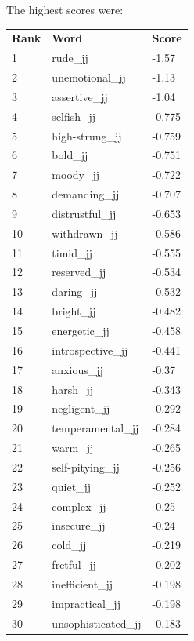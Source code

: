 \documentclass[10pt,letterpaper]{book}
\begin{document}
The highest scores were:
\begin{tabular}{ l l l }
        \textbf{Rank} & \textbf{Word} & \textbf{Score} \\
        1 & rude\_jj & -1.57 \\
        2 & unemotional\_jj & -1.13 \\
        3 & assertive\_jj & -1.04 \\
        4 & selfish\_jj & -0.775 \\
        5 & high-strung\_jj & -0.759 \\
        6 & bold\_jj & -0.751 \\
        7 & moody\_jj & -0.722 \\
        8 & demanding\_jj & -0.707 \\
        9 & distrustful\_jj & -0.653 \\
        10 & withdrawn\_jj & -0.586 \\
        11 & timid\_jj & -0.555 \\
        12 & reserved\_jj & -0.534 \\
        13 & daring\_jj & -0.532 \\
        14 & bright\_jj & -0.482 \\
        15 & energetic\_jj & -0.458 \\
        16 & introspective\_jj & -0.441 \\
        17 & anxious\_jj & -0.37 \\
        18 & harsh\_jj & -0.343 \\
        19 & negligent\_jj & -0.292 \\
        20 & temperamental\_jj & -0.284 \\
        21 & warm\_jj & -0.265 \\
        22 & self-pitying\_jj & -0.256 \\
        23 & quiet\_jj & -0.252 \\
        24 & complex\_jj & -0.25 \\
        25 & insecure\_jj & -0.24 \\
        26 & cold\_jj & -0.219 \\
        27 & fretful\_jj & -0.202 \\
        28 & inefficient\_jj & -0.198 \\
        29 & impractical\_jj & -0.198 \\
        30 & unsophisticated\_jj & -0.183 \\
\end{tabular}
\end{document}
